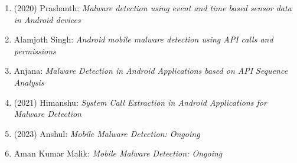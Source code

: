 \begin{itemize}
\begin{enumerate}
\item (2020) Prashanth: \textit{Malware detection using event and time based sensor data in Android devices}
\item Alamjoth Singh: \textit{Android mobile malware detection using API calls and permissions}
\item Anjana: \textit{Malware Detection in Android Applications based on API Sequence Analysis}

\item (2021) Himanshu: \textit{System Call Extraction in Android Applications for Malware Detection}

\item (2023) Anshul: \textit{Mobile Malware Detection: Ongoing}
\item Aman Kumar Malik: \textit{Mobile Malware Detection: Ongoing}
	\end{enumerate}


\end{itemize}
